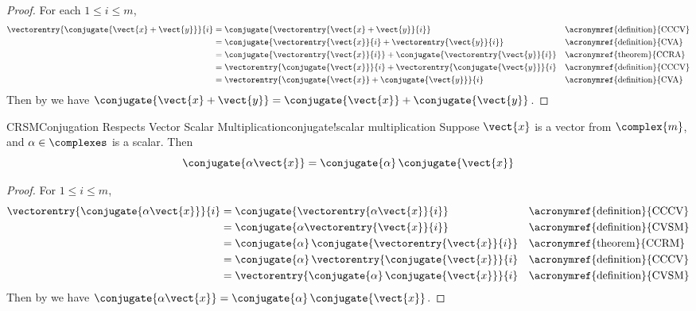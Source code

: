 %
\begin{proof}
%
For each $1\leq i\leq m$,
%
\begin{align*}
\vectorentry{\conjugate{\vect{x}+\vect{y}}}{i}
&=\conjugate{\vectorentry{\vect{x}+\vect{y}}{i}}&&\text{\acronymref{definition}{CCCV}}\\
&=\conjugate{\vectorentry{\vect{x}}{i}+\vectorentry{\vect{y}}{i}}&&\text{\acronymref{definition}{CVA}}\\
&=\conjugate{\vectorentry{\vect{x}}{i}}+\conjugate{\vectorentry{\vect{y}}{i}}&&\text{\acronymref{theorem}{CCRA}}\\
&=\vectorentry{\conjugate{\vect{x}}}{i}+\vectorentry{\conjugate{\vect{y}}}{i}&&\text{\acronymref{definition}{CCCV}}\\
&=\vectorentry{\conjugate{\vect{x}}+\conjugate{\vect{y}}}{i}&&\text{\acronymref{definition}{CVA}}
%
\end{align*}
%
Then by  we have $\conjugate{\vect{x}+\vect{y}}=\conjugate{\vect{x}}+\conjugate{\vect{y}}$.
%
\end{proof}
%
%
\begin{theorem}{CRSM}{Conjugation Respects Vector Scalar Multiplication}{conjugate!scalar multiplication}
Suppose $\vect{x}$ is a vector from $\complex{m}$, and $\alpha\in\complexes$ is a scalar.  Then
%
\begin{equation*}
\conjugate{\alpha\vect{x}}=\conjugate{\alpha}\,\conjugate{\vect{x}}
\end{equation*}
%
\end{theorem}
%
\begin{proof}
%
For $1\leq i\leq m$,
%
\begin{align*}
\vectorentry{\conjugate{\alpha\vect{x}}}{i}
&=\conjugate{\vectorentry{\alpha\vect{x}}{i}}&&\text{\acronymref{definition}{CCCV}}\\
%
&=\conjugate{\alpha\vectorentry{\vect{x}}{i}}&&\text{\acronymref{definition}{CVSM}}\\
%
&=\conjugate{\alpha}\,\conjugate{\vectorentry{\vect{x}}{i}}&&\text{\acronymref{theorem}{CCRM}}\\
%
&=\conjugate{\alpha}\,\vectorentry{\conjugate{\vect{x}}}{i}&&\text{\acronymref{definition}{CCCV}}\\
%
&=\vectorentry{\conjugate{\alpha}\,\conjugate{\vect{x}}}{i}&&\text{\acronymref{definition}{CVSM}}\\
%
\end{align*}
%
Then by  we have $\conjugate{\alpha\vect{x}}=\conjugate{\alpha}\,\conjugate{\vect{x}}$.
%
\end{proof}
